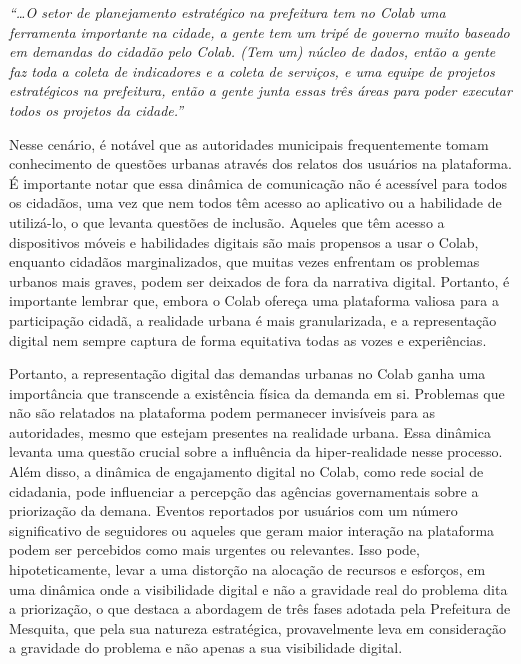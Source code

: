 \begin{citacao}
	\textit{“…O setor de planejamento estratégico na prefeitura tem no Colab uma ferramenta importante na cidade, a gente tem um tripé de governo muito baseado em demandas do cidadão pelo Colab. (Tem um) núcleo de dados, então a gente faz toda a coleta de indicadores e a coleta de serviços, e uma equipe de projetos estratégicos na prefeitura, então a gente junta essas três áreas para poder executar todos os projetos da cidade.”}
\end{citacao}

Nesse cenário, é notável que as autoridades municipais frequentemente tomam conhecimento de questões urbanas através dos relatos dos usuários na plataforma. É importante notar que essa dinâmica de comunicação não é acessível para todos os cidadãos, uma vez que nem todos têm acesso ao aplicativo ou a habilidade de utilizá-lo, o que levanta questões de inclusão. Aqueles que têm acesso a dispositivos móveis e habilidades digitais são mais propensos a usar o Colab, enquanto cidadãos marginalizados, que muitas vezes enfrentam os problemas urbanos mais graves, podem ser deixados de fora da narrativa digital. Portanto, é importante lembrar que, embora o Colab ofereça uma plataforma valiosa para a participação cidadã, a realidade urbana é mais granularizada, e a representação digital nem sempre captura de forma equitativa todas as vozes e experiências.

Portanto, a representação digital das demandas urbanas no Colab ganha uma importância que transcende a existência física da demanda em si. Problemas que não são relatados na plataforma podem permanecer invisíveis para as autoridades, mesmo que estejam presentes na realidade urbana. Essa dinâmica levanta uma questão crucial sobre a influência da hiper-realidade nesse processo. Além disso, a dinâmica de engajamento digital no Colab, como rede social de cidadania, pode influenciar a percepção das agências governamentais sobre a priorização da demana. Eventos reportados por usuários com um número significativo de seguidores ou aqueles que geram maior interação na plataforma podem ser percebidos como mais urgentes ou relevantes. Isso pode, hipoteticamente, levar a uma distorção na alocação de recursos e esforços, em uma dinâmica onde a visibilidade digital e não a gravidade real do problema dita a priorização, o que destaca a abordagem de três fases adotada pela Prefeitura de Mesquita, que pela sua natureza estratégica, provavelmente leva em consideração a gravidade do problema e não apenas a sua visibilidade digital.

